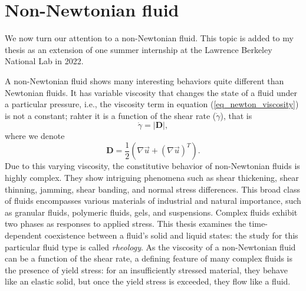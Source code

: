 \section{Non-Newtonian fluid}
We now turn our attention to a non-Newtonian fluid. This topic is added to my thesis as an extension of one summer internship at the Lawrence Berkeley National Lab in 2022. 
\par
A non-Newtonian fluid shows many interesting behaviors quite different than Newtonian fluids. It has variable viscosity that changes the state of a fluid under a particular pressure, i.e., the viscosity term in equation (\ref{eq_newton_viscosity}) is not a constant; rahter it is a function of the shear rate ($\dot{\gamma}$), that is
\begin{equation}
   \dot{\gamma} = \left| 
   {\boldsymbol{D}}
   \right|,
\end{equation}
where we denote
\[
   {\boldsymbol{D}} = 
   \frac{1}{2} \left( \nabla \vec{u} + (\nabla  \vec{u})^T \right).    
\]
Due to this varying viscosity, the constitutive behavior of non-Newtonian fluids is highly complex. They show intriguing phenomena such as shear thickening, shear thinning, jamming, shear banding, and normal stress differences. This broad class of fluids encompasses various materials of industrial and natural importance, such as granular fluids, polymeric fluids, gels, and suspensions. Complex fluids exhibit two phases as responses to applied stress. This thesis examines the time-dependent coexistence between a fluid's solid and liquid states: the study for this particular fluid type is called {\textit{rheology}}. As the viscosity of a non-Newtonian fluid can be a function of the shear rate, a defining feature of many complex fluids is the presence of yield stress: for an insufficiently stressed material, they behave like an elastic solid, but once the yield stress is exceeded, they flow like a fluid. 
\par
